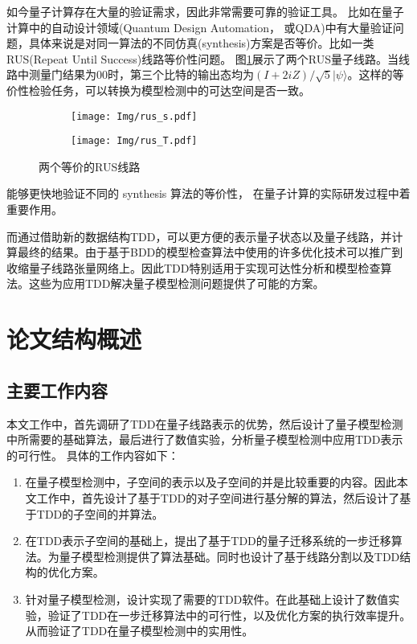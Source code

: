 如今量子计算存在大量的验证需求，因此非常需要可靠的验证工具。
比如在量子计算中的自动设计领域(Quantum Design Automation， 或QDA)中有大量验证问题，具体来说是对同一算法的不同仿真(synthesis)方案是否等价。比如一类RUS(Repeat Until Success)线路等价性问题。
图\ref{fig:rus-equal}展示了两个RUS量子线路。当线路中测量门结果为$00$时，第三个比特的输出态均为$\left(I+2iZ\right)/ \sqrt 5 |\psi\rangle$。这样的等价性检验任务，可以转换为模型检测中的可达空间是否一致。
\begin{figure}[!htbp]
	\centering
	\begin{subfigure}[b]{0.45\textwidth}
        \centering
        \texttt{[image: Img/rus\_s.pdf]}
	\end{subfigure}
	\qquad
	\begin{subfigure}[b]{0.45\textwidth}
        \centering
        \texttt{[image: Img/rus\_T.pdf]}
	\end{subfigure}
	\caption{两个等价的RUS线路\citep{Bocharov_2015}}
	\label{fig:rus-equal}
\end{figure}
能够更快地验证不同的 synthesis 算法的等价性，
在量子计算的实际研发过程中着重要作用。

而通过借助新的数据结构TDD，可以更方便的表示量子状态以及量子线路，并计算最终的结果。由于基于BDD的模型检查算法中使用的许多优化技术可以推广到收缩量子线路张量网络上\citep{Chaki_2018}。因此TDD特别适用于实现可达性分析和模型检查算法。这些为应用TDD解决量子模型检测问题提供了可能的方案。
\section{论文结构概述}

\subsection*{主要工作内容}
本文工作中，首先调研了TDD在量子线路表示的优势，然后设计了量子模型检测中所需要的基础算法，最后进行了数值实验，分析量子模型检测中应用TDD表示的可行性。
具体的工作内容如下：
\begin{enumerate}
    \item 在量子模型检测中，子空间的表示以及子空间的并是比较重要的内容。因此本文工作中，首先设计了基于TDD的对子空间进行基分解的算法，然后设计了基于TDD的子空间的并算法。
    \item 
    在TDD表示子空间的基础上，提出了基于TDD的量子迁移系统的一步迁移算法。为量子模型检测提供了算法基础。同时也设计了基于线路分割以及TDD结构的优化方案。
    \item 针对量子模型检测，设计实现了需要的TDD软件。在此基础上设计了数值实验，验证了TDD在一步迁移算法中的可行性，以及优化方案的执行效率提升。从而验证了TDD在量子模型检测中的实用性。
\end{enumerate}

